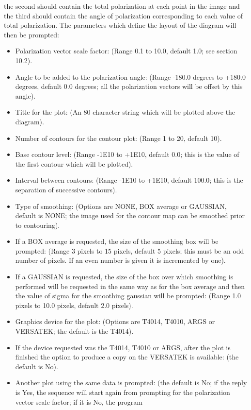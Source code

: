 \begin{description}
the second should contain the total polarization at each point in the image and
the third should contain the angle of polarization corresponding to each value
of total polarization.
The parameters which define the layout of the diagram will then be prompted:
\begin{itemize}
\item Polarization vector scale factor:
(Range 0.1 to 10.0, default 1.0; see section 10.2).
\item Angle to be added to the polarization angle:
(Range -180.0 degrees to +180.0 degrees, default 0.0 degrees; all the
polarization vectors will be offset by this angle).
\item Title for the plot:
(An 80 character string which will be plotted above the diagram).
\item Number of contours for the contour plot:
(Range 1 to 20, default 10).
\item Base contour level:
(Range -1E10 to +1E10, default 0.0; this is the value of the first contour
which will be plotted).
\item Interval between contours:
(Range -1E10 to +1E10, default 100.0; this is the separation of successive
contours).
\item Type of smoothing:
(Options are NONE, BOX average or GAUSSIAN, default is NONE; the image used for
the contour map can be smoothed prior to contouring).
\item If a BOX average is requested, the size of the smoothing box will be
prompted:
(Range 3 pixels to 15 pixels, default 5 pixels; this must be an odd number of
pixels.
If an even number is given it is incremented by one).
\item If a GAUSSIAN is requested, the size of the box over which smoothing is
performed will be requested in the same way as for the box average and then the
value of sigma for the smoothing gaussian will be prompted:
(Range 1.0 pixels to 10.0 pixels, default 2.0 pixels).
\item Graphics device for the plot:
(Options are T4014, T4010, ARGS or VERSATEK; the default is the T4014).
\item If the device requested was the T4014, T4010 or ARGS, after the plot is
finished the option to produce a copy on the VERSATEK is available:
(the default is No).
\item Another plot using the same data is prompted:
(the default is No; if the reply is Yes, the sequence will start again from
prompting for the polarization vector scale factor; if it is No, the program

\end{itemize}
\end{description}
